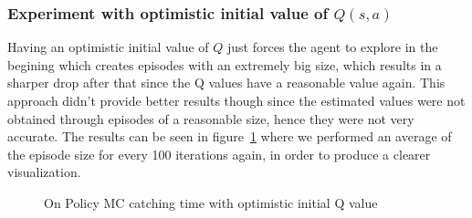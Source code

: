 \documentclass[paper=a4, fontsize=11pt]{scrartcl}
\numberwithin{equation}{section}		%
\numberwithin{figure}{section}			%
\numberwithin{table}{section}				%
\begin{document}
\subsubsection*{Experiment with optimistic initial value of $Q(s,a)$}
Having an optimistic initial value of $Q$ just forces the agent to explore in the begining which creates episodes with an extremely big size, which results in a sharper drop after that since the Q values have a reasonable value again. This approach didn't provide better results though since the estimated values were not obtained through episodes of a reasonable size, hence they were not very accurate. The results can be seen in figure~\ref{figure:differentFixEpsilonOnOpt} where we performed an average of the episode size for every 100 iterations again, in order to produce a clearer visualization.
\begin{figure}[h] \centering
\caption{On Policy MC catching time with optimistic initial Q value} \label{figure:differentFixEpsilonOnOpt}
\end{figure}
\end{document}
